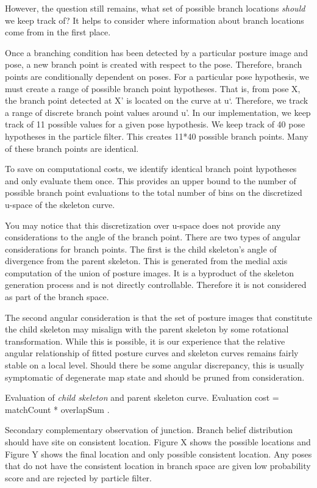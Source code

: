 However, the question still remains, what set of possible branch locations \emph{should} we keep track of? It helps to consider where information about branch locations come from in the first place.

Once a branching condition has been detected by a particular posture image and pose, a new branch point is created with respect to the pose. Therefore, branch points are conditionally dependent on poses. For a particular pose hypothesis, we must create a range of possible branch point hypotheses. That is, from pose X, the branch point detected at X' is located on the curve at u`. Therefore, we track a range of discrete branch point values around u'. In our implementation, we keep track of 11 possible values for a given pose hypothesis. We keep track of 40 pose hypotheses in the particle filter. This creates 11*40 possible branch points. Many of these branch points are identical.

To save on computational costs, we identify identical branch point hypotheses and only evaluate them once. This provides an upper bound to the number of possible branch point evaluations to the total number of bins on the discretized u-space of the skeleton curve.

You may notice that this discretization over u-space does not provide any considerations to the angle of the branch point. There are two types of angular considerations for branch points. The first is the child skeleton's angle of divergence from the parent skeleton. This is generated from the medial axis computation of the union of posture images. It is a byproduct of the skeleton generation process and is not directly controllable. Therefore it is not considered as part of the branch space. 

The second angular consideration is that the set of posture images that constitute the child skeleton may misalign with the parent skeleton by some rotational transformation. While this is possible, it is our experience that the relative angular relationship of fitted posture curves and skeleton curves remains fairly stable on a local level. Should there be some angular discrepancy, this is usually symptomatic of degenerate map state and should be pruned from consideration.

Evaluation of \emph{child skeleton} and parent skeleton curve. Evaluation cost = matchCount * overlapSum . 

Secondary complementary observation of junction. Branch belief distribution should have site on consistent location. Figure X shows the possible locations and Figure Y shows the final location and only possible consistent location. Any poses that do not have the consistent location in branch space are given low probability score and are rejected by particle filter. 

